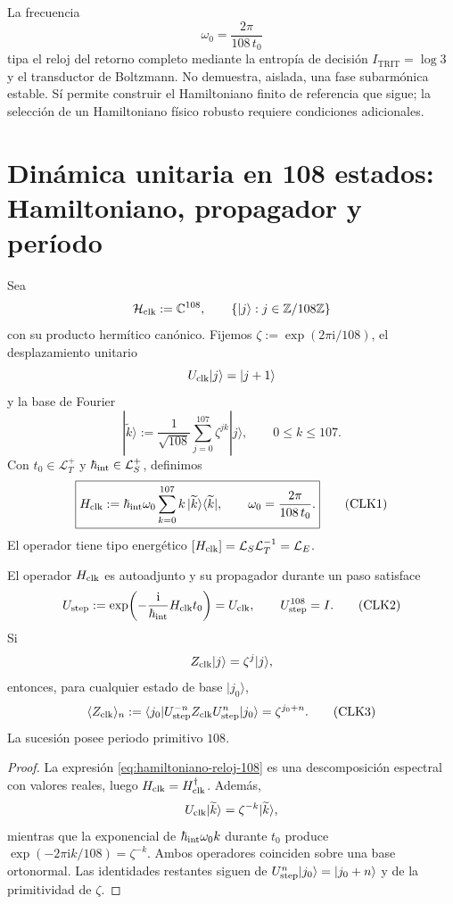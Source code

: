 La frecuencia
\[
 \omega_0=\frac{2\pi}{108\,t_0}
\]
tipa el reloj del retorno completo mediante la entropía de decisión
\(I_{\mathrm{TRIT}}=\log 3\) y el transductor de Boltzmann.
No demuestra, aislada, una fase subarmónica estable. Sí permite construir el
Hamiltoniano finito de referencia que sigue; la selección de un Hamiltoniano
físico robusto requiere condiciones adicionales.

\section{Dinámica unitaria en 108 estados: Hamiltoniano, propagador y período}
\label{sec:hamiltoniano-reloj-108}

Sea
\[
 \mathcal H_{\rm clk}:=\mathbb C^{108},
 \qquad
 \{|j\rangle:j\in\mathbb Z/108\mathbb Z\}
\]
con su producto hermítico canónico. Fijemos
\(\zeta:=\exp(2\pi\mathrm i/108)\), el desplazamiento unitario
\[
 U_{\rm clk}|j\rangle=|j+1\rangle
\]
y la base de Fourier
\[
 |\widetilde k\rangle
 :=\frac1{\sqrt{108}}\sum_{j=0}^{107}\zeta^{jk}|j\rangle,
 \qquad 0\leq k\leq107.
\]
Con \(t_0\in\mathcal L_T^+\) y
\(\hbar_{\rm int}\in\mathcal L_S^+\), definimos
\[
 \boxed{
 H_{\rm clk}
 :=\hbar_{\rm int}\omega_0
 \sum_{k=0}^{107}k\,
 |\widetilde k\rangle\langle\widetilde k|,
 \qquad
 \omega_0=\frac{2\pi}{108\,t_0}.}
 \tag{CLK1}\label{eq:hamiltoniano-reloj-108}
\]
El operador tiene tipo energético
\([H_{\rm clk}]=\mathcal L_S\mathcal L_T^{-1}=\mathcal L_E\).

\begin{theorem}
\label{thm:reloj-unitario-108}
El operador \(H_{\rm clk}\) es autoadjunto y su propagador durante un paso
satisface
\[
 U_{\rm step}
 :=\exp\!\left(-\frac{\mathrm i}{\hbar_{\rm int}}
 H_{\rm clk}t_0\right)
 =U_{\rm clk},
 \qquad
 U_{\rm step}^{108}=I.
 \tag{CLK2}\label{eq:propagador-reloj-108}
\]
Si
\[
 Z_{\rm clk}|j\rangle=\zeta^j|j\rangle,
\]
entonces, para cualquier estado de base \(|j_0\rangle\),
\[
 \langle Z_{\rm clk}\rangle_{n}
 :=\langle j_0|U_{\rm step}^{-n}Z_{\rm clk}
 U_{\rm step}^n|j_0\rangle
 =\zeta^{j_0+n}.
 \tag{CLK3}\label{eq:respuesta-reloj-108}
\]
La sucesión posee periodo primitivo \(108\).
\end{theorem}

\begin{proof}
La expresión \eqref{eq:hamiltoniano-reloj-108} es una descomposición
espectral con valores reales, luego \(H_{\rm clk}=H_{\rm clk}^\dagger\).
Además,
\[
 U_{\rm clk}|\widetilde k\rangle
 =\zeta^{-k}|\widetilde k\rangle,
\]
mientras que la exponencial de
\(\hbar_{\rm int}\omega_0 k\) durante \(t_0\) produce
\(\exp(-2\pi\mathrm ik/108)=\zeta^{-k}\). Ambos operadores coinciden sobre
una base ortonormal. Las identidades restantes siguen de
\(U_{\rm step}^n|j_0\rangle=|j_0+n\rangle\) y de la primitividad de
\(\zeta\).
\end{proof}

